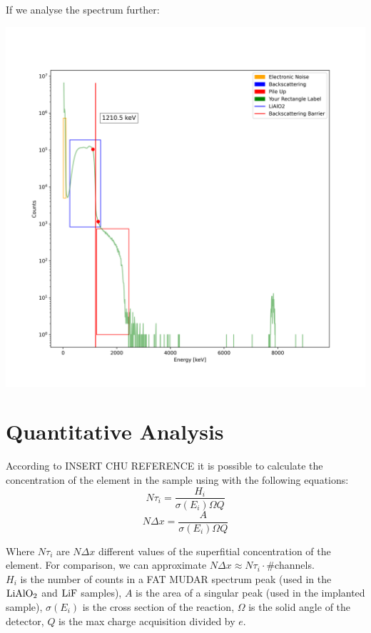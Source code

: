 \documentclass{article}
\begin{document}
\begin{multicols}{2}
If we analyse the spectrum further:

\begin{center}
    \label{TT_21}
    \centering
    \includegraphics[scale = 0.4]{../../images/FullAnalysisImplanted.png}
\end{center}



\section{Quantitative Analysis}
According to INSERT CHU REFERENCE it is possible to calculate the concentration of the element in the sample using with the following equations:
\begin{equation}
    N\tau_i=\frac{H_i}{\sigma (E_i)\Omega Q}
\end{equation}
\begin{equation}
    N\Delta x=\frac{A}{\sigma (E_i)\Omega Q}
\end{equation}

Where $N\tau_i$ are $N\Delta x$ different values of the superfitial concentration of the element. For comparison, we can approximate $N\Delta x \approx N\tau_i \cdot$\#channels.\\
$H_i$ is the number of counts in a FAT MUDAR spectrum peak (used in the $\ce{LiAlO2}$ and $\ce{LiF}$ samples), $A$ is the area of a singular peak (used in the implanted sample), $\sigma (E_i) $ is the cross section of the reaction, $\Omega$ is the solid angle of the detector, $Q$ is the max charge acquisition divided by $e$.


\end{multicols}
\end{document}
